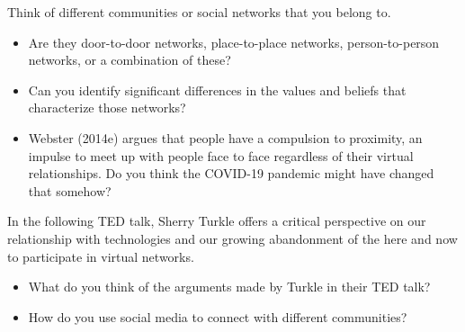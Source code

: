 \documentclass[
  letterpaper,
  DIV=11,
  numbers=noendperiod]{scrreprt}
\begin{document}
\begin{tcolorbox}[enhanced jigsaw, arc=.35mm, bottomrule=.15mm, bottomtitle=1mm, breakable, colback=white, colbacktitle=quarto-callout-tip-color!10!white, colframe=quarto-callout-tip-color-frame, coltitle=black, left=2mm, leftrule=.75mm, opacityback=0, opacitybacktitle=0.6, rightrule=.15mm, title=\textcolor{quarto-callout-tip-color}{\faLightbulb}\hspace{0.5em}{Stop and reflect}, titlerule=0mm, toprule=.15mm, toptitle=1mm]

Think of different communities or social networks that you belong to.

\begin{itemize}
\item
  Are they door-to-door networks, place-to-place networks,
  person-to-person networks, or a combination of these?
\item
  Can you identify significant differences in the values and beliefs
  that characterize those networks?
\item
  Webster (2014e) argues that people have a compulsion to proximity, an
  impulse to meet up with people face to face regardless of their
  virtual relationships. Do you think the COVID-19 pandemic might have
  changed that somehow?
\end{itemize}

\end{tcolorbox}

In the following TED talk, Sherry Turkle offers a critical perspective
on our relationship with technologies and our growing abandonment of the
here and now to participate in virtual networks.

\begin{tcolorbox}[enhanced jigsaw, arc=.35mm, bottomrule=.15mm, bottomtitle=1mm, breakable, colback=white, colbacktitle=quarto-callout-tip-color!10!white, colframe=quarto-callout-tip-color-frame, coltitle=black, left=2mm, leftrule=.75mm, opacityback=0, opacitybacktitle=0.6, rightrule=.15mm, title=\textcolor{quarto-callout-tip-color}{\faLightbulb}\hspace{0.5em}{Pause and reflect}, titlerule=0mm, toprule=.15mm, toptitle=1mm]

\begin{itemize}
\item
  What do you think of the arguments made by Turkle in their TED talk?
\item
  How do you use social media to connect with different communities?
\end{itemize}

\end{tcolorbox}
\end{document}

